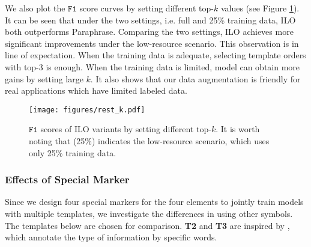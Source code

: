 \documentclass[11pt]{article}
\begin{document}
\begin{comment}
\begin{figure}[t]
\centering
\subfigure[Results on Rest15]{
\texttt{[image: figures/rest15\_valid\_entropy.pdf]}}
\subfigure[Results on Rest16]{
\texttt{[image: figures/rest16\_valid\_entropy.pdf]}}
\caption{Evaluation .}
\label{fig:figure_choosing_effects}
\end{figure}

\begin{figure}[t]
\centering
\texttt{[image: figures/valid\_entropy.pdf]} 
\caption{T.}
\label{fig:valid_entropy}
\end{figure}
\end{comment}



We also plot the $\mathtt{F1}$ score curves by setting different top-$k$ values (see Figure \ref{fig:figure_scale}). It can be seen that under the two settings, i.e. full and 25\% training data, ILO both outperforms Paraphrase. Comparing the two settings, ILO achieves more significant improvements under the low-resource scenario. This observation is in line of expectation. When the training data is adequate, selecting template orders with top-3 is enough. When the training data is limited, model can obtain more gains by setting large $k$. It also shows that our data augmentation is friendly for real applications which have limited labeled data. 

\begin{figure}[t]
\centering
\texttt{[image: figures/rest\_k.pdf]} 
\caption{$\mathtt{F1}$ scores of ILO variants by setting different top-$k$. It is worth noting that (25\%) indicates the low-resource scenario, which uses only 25\% training data.}
\label{fig:figure_scale}
\end{figure}




\subsubsection{Effects of Special Marker}
Since we design four special markers for the four elements to jointly train models with multiple templates, we investigate the differences in using other symbols. The templates below are chosen for comparison. \textbf{T2} and \textbf{T3} are inspired by \citet{chia-etal-2022-relationprompt}, which annotate the type of information by specific words.
\end{document}

